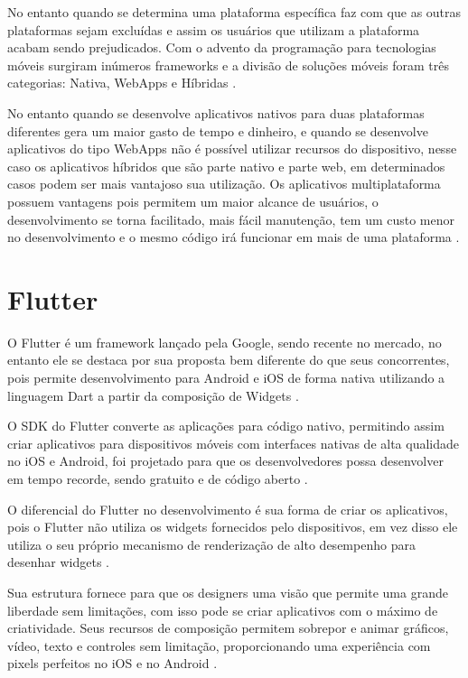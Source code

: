 \documentclass{ifto-tex}
\begin{document}
	No entanto quando se determina uma plataforma específica faz com que as outras plataformas sejam excluídas e assim os usuários que utilizam a plataforma acabam sendo prejudicados.
	Com o advento da programação para tecnologias móveis surgiram inúmeros frameworks e a divisão de soluções móveis foram três categorias: Nativa, WebApps e Híbridas \cite{Desenvol53:online}.
	
	No entanto quando se desenvolve aplicativos nativos para duas plataformas diferentes gera um maior gasto de tempo e dinheiro, e quando se desenvolve aplicativos do tipo WebApps não é possível utilizar recursos do dispositivo, nesse caso os aplicativos híbridos que são parte nativo e parte web, em determinados casos podem ser mais vantajoso sua utilização.
	Os aplicativos multiplataforma possuem vantagens pois permitem um maior alcance de usuários, o desenvolvimento se torna facilitado, mais fácil manutenção, tem um custo menor no desenvolvimento e o mesmo código irá funcionar em mais de uma plataforma \cite{Benefits70:online}.
	
	
	\section{Flutter}
O Flutter é um framework lançado pela Google, sendo recente no mercado, no entanto ele se destaca por sua proposta bem diferente do que seus concorrentes, pois permite desenvolvimento para Android e iOS de forma nativa utilizando a linguagem Dart a partir da composição de Widgets \cite{Conhecen37:online}.

O SDK do Flutter converte as aplicações para código nativo, permitindo assim criar aplicativos para dispositivos móveis com interfaces nativas de alta qualidade no iOS e Android, foi projetado para que os desenvolvedores possa desenvolver em tempo recorde, sendo gratuito e de código aberto \cite{flutterf54:online}.

O diferencial do Flutter no desenvolvimento é sua forma de criar os aplicativos, pois o Flutter não utiliza os widgets fornecidos pelo dispositivos, em vez disso ele utiliza o seu próprio mecanismo de renderização de alto desempenho para desenhar widgets \cite{corazza2018aplicativo}.

Sua estrutura fornece para que os designers uma visão que permite uma grande liberdade sem limitações, com isso pode se criar aplicativos com o máximo de criatividade. Seus recursos de composição permitem sobrepor e animar gráficos, vídeo, texto e controles sem limitação, proporcionando uma experiência com pixels perfeitos no iOS e no Android \cite{flutterf54:online}.
\end{document}
